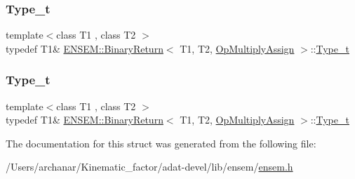 \mbox{\label{structENSEM_1_1BinaryReturn_3_01T1_00_01T2_00_01OpMultiplyAssign_01_4_adc30f204bdf8c74d41a342332a239687}} 
\subsubsection{\texorpdfstring{Type\_t}{Type\_t}\hspace{0.1cm}{\footnotesize\ttfamily [2/3]}}
{\footnotesize\ttfamily template$<$class T1 , class T2 $>$ \\
typedef T1\& \mbox{\hyperlink{structENSEM_1_1BinaryReturn}{E\+N\+S\+E\+M\+::\+Binary\+Return}}$<$ T1, T2, \mbox{\hyperlink{structENSEM_1_1OpMultiplyAssign}{Op\+Multiply\+Assign}} $>$\+::\mbox{\hyperlink{structENSEM_1_1BinaryReturn_3_01T1_00_01T2_00_01OpMultiplyAssign_01_4_adc30f204bdf8c74d41a342332a239687}{Type\+\_\+t}}}

\mbox{\label{structENSEM_1_1BinaryReturn_3_01T1_00_01T2_00_01OpMultiplyAssign_01_4_adc30f204bdf8c74d41a342332a239687}} 
\subsubsection{\texorpdfstring{Type\_t}{Type\_t}\hspace{0.1cm}{\footnotesize\ttfamily [3/3]}}
{\footnotesize\ttfamily template$<$class T1 , class T2 $>$ \\
typedef T1\& \mbox{\hyperlink{structENSEM_1_1BinaryReturn}{E\+N\+S\+E\+M\+::\+Binary\+Return}}$<$ T1, T2, \mbox{\hyperlink{structENSEM_1_1OpMultiplyAssign}{Op\+Multiply\+Assign}} $>$\+::\mbox{\hyperlink{structENSEM_1_1BinaryReturn_3_01T1_00_01T2_00_01OpMultiplyAssign_01_4_adc30f204bdf8c74d41a342332a239687}{Type\+\_\+t}}}



The documentation for this struct was generated from the following file\+:\begin{DoxyCompactItemize}
\item 
/\+Users/archanar/\+Kinematic\+\_\+factor/adat-\/devel/lib/ensem/\mbox{\hyperlink{adat-devel_2lib_2ensem_2ensem_8h}{ensem.\+h}}\end{DoxyCompactItemize}
